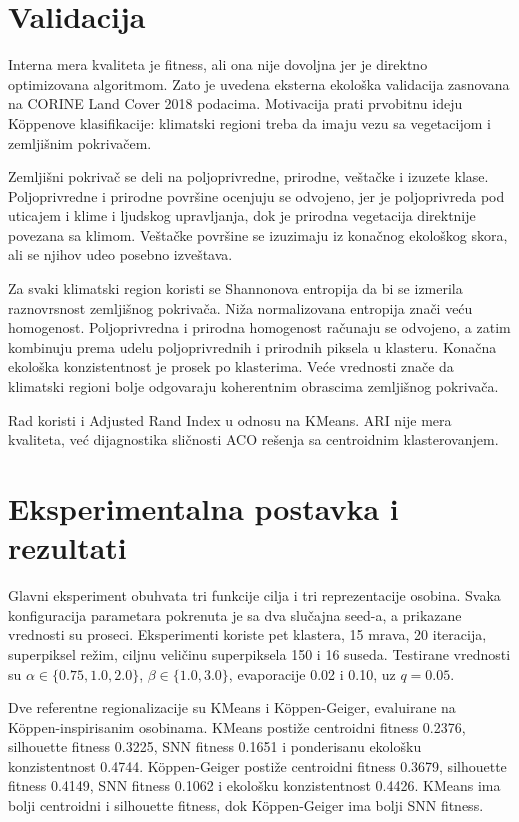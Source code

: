 \documentclass[11pt]{article}
\begin{document}
\section*{Validacija}

Interna mera kvaliteta je fitness, ali ona nije dovoljna jer je direktno optimizovana algoritmom. Zato je uvedena eksterna ekološka validacija zasnovana na CORINE Land Cover 2018 podacima. Motivacija prati prvobitnu ideju Köppenove klasifikacije: klimatski regioni treba da imaju vezu sa vegetacijom i zemljišnim pokrivačem.

Zemljišni pokrivač se deli na poljoprivredne, prirodne, veštačke i izuzete klase. Poljoprivredne i prirodne površine ocenjuju se odvojeno, jer je poljoprivreda pod uticajem i klime i ljudskog upravljanja, dok je prirodna vegetacija direktnije povezana sa klimom. Veštačke površine se izuzimaju iz konačnog ekološkog skora, ali se njihov udeo posebno izveštava.

Za svaki klimatski region koristi se Shannonova entropija da bi se izmerila raznovrsnost zemljišnog pokrivača. Niža normalizovana entropija znači veću homogenost. Poljoprivredna i prirodna homogenost računaju se odvojeno, a zatim kombinuju prema udelu poljoprivrednih i prirodnih piksela u klasteru. Konačna ekološka konzistentnost je prosek po klasterima. Veće vrednosti znače da klimatski regioni bolje odgovaraju koherentnim obrascima zemljišnog pokrivača.

Rad koristi i Adjusted Rand Index u odnosu na KMeans. ARI nije mera kvaliteta, već dijagnostika sličnosti ACO rešenja sa centroidnim klasterovanjem.

\section*{Eksperimentalna postavka i rezultati}

Glavni eksperiment obuhvata tri funkcije cilja i tri reprezentacije osobina. Svaka konfiguracija parametara pokrenuta je sa dva slučajna seed-a, a prikazane vrednosti su proseci. Eksperimenti koriste pet klastera, 15 mrava, 20 iteracija, superpiksel režim, ciljnu veličinu superpiksela 150 i 16 suseda. Testirane vrednosti su $\alpha \in \{0.75, 1.0, 2.0\}$, $\beta \in \{1.0, 3.0\}$, evaporacije 0.02 i 0.10, uz $q=0.05$.

Dve referentne regionalizacije su KMeans i Köppen-Geiger, evaluirane na Köppen-inspirisanim osobinama. KMeans postiže centroidni fitness 0.2376, silhouette fitness 0.3225, SNN fitness 0.1651 i ponderisanu ekološku konzistentnost 0.4744. Köppen-Geiger postiže centroidni fitness 0.3679, silhouette fitness 0.4149, SNN fitness 0.1062 i ekološku konzistentnost 0.4426. KMeans ima bolji centroidni i silhouette fitness, dok Köppen-Geiger ima bolji SNN fitness.
\end{document}
